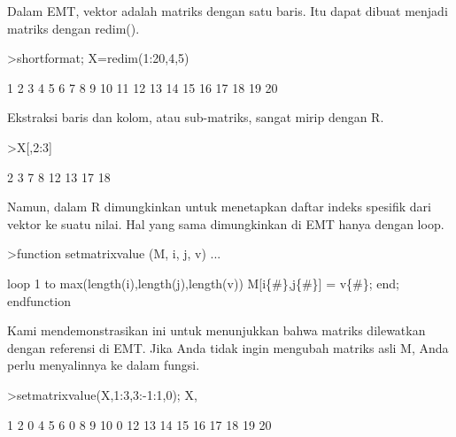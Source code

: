 \documentclass{article}
\begin{document}
\begin{eulernotebook}
\begin{eulercomment}
\begin{eulercomment}
\begin{eulercomment}
Dalam EMT, vektor adalah matriks dengan satu baris. Itu dapat dibuat
menjadi matriks dengan redim().
\end{eulercomment}
\begin{eulerprompt}
>shortformat; X=redim(1:20,4,5)
\end{eulerprompt}
\begin{euleroutput}
          1         2         3         4         5 
          6         7         8         9        10 
         11        12        13        14        15 
         16        17        18        19        20 
\end{euleroutput}
\begin{eulercomment}
Ekstraksi baris dan kolom, atau sub-matriks, sangat mirip dengan R.
\end{eulercomment}
\begin{eulerprompt}
>X[,2:3]
\end{eulerprompt}
\begin{euleroutput}
          2         3 
          7         8 
         12        13 
         17        18 
\end{euleroutput}
\begin{eulercomment}
Namun, dalam R dimungkinkan untuk menetapkan daftar indeks spesifik
dari vektor ke suatu nilai. Hal yang sama dimungkinkan di EMT hanya
dengan loop.
\end{eulercomment}
\begin{eulerprompt}
>function setmatrixvalue (M, i, j, v) ...
\end{eulerprompt}
\begin{eulerudf}
  loop 1 to max(length(i),length(j),length(v))
     M[i\{#\},j\{#\}] = v\{#\};
  end;
  endfunction
\end{eulerudf}
\begin{eulercomment}
Kami mendemonstrasikan ini untuk menunjukkan bahwa matriks dilewatkan
dengan referensi di EMT. Jika Anda tidak ingin mengubah matriks asli
M, Anda perlu menyalinnya ke dalam fungsi.
\end{eulercomment}
\begin{eulerprompt}
>setmatrixvalue(X,1:3,3:-1:1,0); X,
\end{eulerprompt}
\begin{euleroutput}
          1         2         0         4         5 
          6         0         8         9        10 
          0        12        13        14        15 
         16        17        18        19        20 
\end{euleroutput}
\begin{eulercomment}

\end{eulercomment}
\end{eulercomment}
\end{eulercomment}
\end{eulernotebook}
\end{document}
